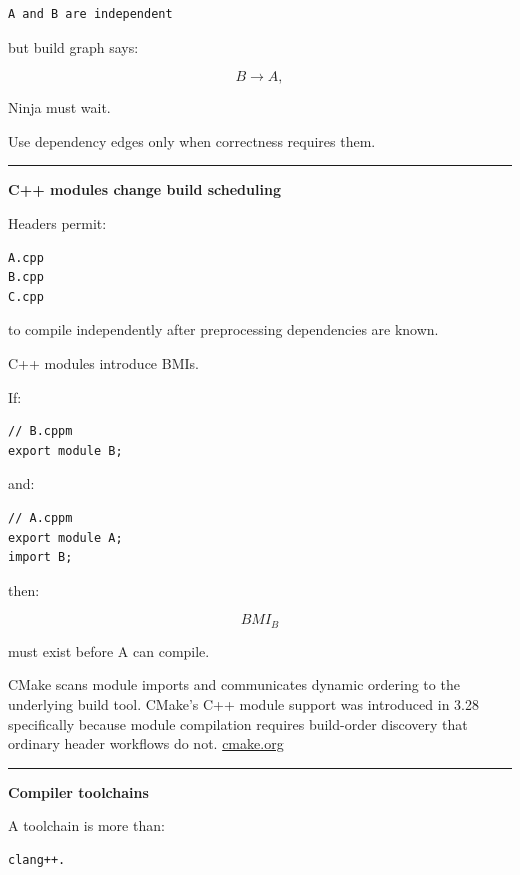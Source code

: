 \begin{verbatim}
A and B are independent
\end{verbatim}

but build graph says:

\[
B\rightarrow A,
\]

Ninja must wait.

Use dependency edges only when correctness requires them.

\begin{center}\rule{0.5\linewidth}{0.5pt}\end{center}

\textbf{C++ modules change build scheduling}

Headers permit:

\begin{verbatim}
A.cpp
B.cpp
C.cpp
\end{verbatim}

to compile independently after preprocessing dependencies are known.

C++ modules introduce BMIs.

If:

\begin{verbatim}
// B.cppm
export module B;
\end{verbatim}

and:

\begin{verbatim}
// A.cppm
export module A;
import B;
\end{verbatim}

then:

\[
BMI_B
\]

must exist before A can compile.

CMake scans module imports and communicates dynamic ordering to the underlying build tool. CMake's C++ module support was introduced in 3.28 specifically because module compilation requires build-order discovery that ordinary header workflows do not. \href{https://cmake.org/cmake/help/git-stage/manual/cmake-cxxmodules.7.html?utm_source=chatgpt.com}{cmake.org}

\begin{center}\rule{0.5\linewidth}{0.5pt}\end{center}

\textbf{Compiler toolchains}

A toolchain is more than:

\begin{verbatim}
clang++.
\end{verbatim}

